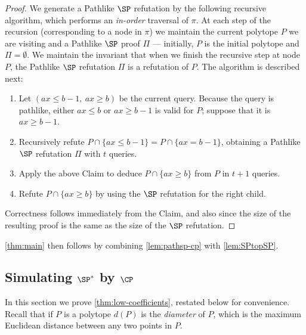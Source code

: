 \documentclass[11pt]{article}
\numberwithin{equation}{section}
\theoremstyle{definition}
\theoremstyle{plain}
\newcounter{cor}\renewcommand{\thecor}{1.1.\arabic{cor}}\newenvironment{cor}{\ifnum\value{cor}=0\refstepcounter{cor}\else\PackageError{toc-native-compat}{Unsupported additional cor envelope}{Only the one exact source-observed cor paragraph is allowed.}\fi}{}\providecommand{\corautorefname}{Theorem}
\newcommand{\set}[1]{\{ #1 \}}
\begin{document}
\begin{proof}
	We generate a Pathlike $\SP$ refutation by the following recursive algorithm, which performs an \emph{in-order} traversal of $\pi$. 
	At each step of the recursion (corresponding to a node in $\pi$) we maintain the current polytope $P$ we are visiting and a Pathlike $\SP$ proof $\Pi$ --- initially, $P$ is the initial polytope and $\Pi = \emptyset$. 
	We maintain the invariant that when we finish the recursive step at node $P$, the Pathlike $\SP$ refutation $\Pi$ is a refutation of $P$. 
	The algorithm is described next:
	\begin{enumerate}
		\item Let $(ax \leq b-1,~ ax \geq b)$ be the current query. Because the query is pathlike, either $ax \leq b$ or $ax \geq b-1$ is valid for $P$; suppose that it is $ax \geq b-1$. 
		\item Recursively refute $P \cap \{ ax \leq b-1\} = P \cap \set{ax = b-1}$, obtaining a Pathlike $\SP$ refutation $\Pi$ with $t$ queries. 
		\item Apply the above Claim to deduce $P \cap \{ax \geq b\}$ from $P$ in $t+1$ queries. 
		\item Refute $P \cap \{ ax \geq b\}$ by using the $\SP$ refutation for the right child. 
	\end{enumerate}
	Correctness follows immediately from the Claim, and also since the size of the resulting proof is the same as the size of the $\SP$ refutation. 		
	\end{proof}
	
	\autoref{thm:main} then follows by combining \autoref{lem:pathsp-cp} with \autoref{lem:SPtopSP}.


\subsection{Simulating \texorpdfstring{$\SP^*$}{SP*} by
          \texorpdfstring{$\CP$}{CP}}
\label{sec:quasipoly-simulation}
In this section we prove \autoref{thm:low-coefficients}, restated below for convenience.
Recall that if $P$ is a polytope $d(P)$ is the \emph{diameter} of $P$, which is the maximum Euclidean distance between any two points in $P$.

\lowcoefficients*
\end{document}
